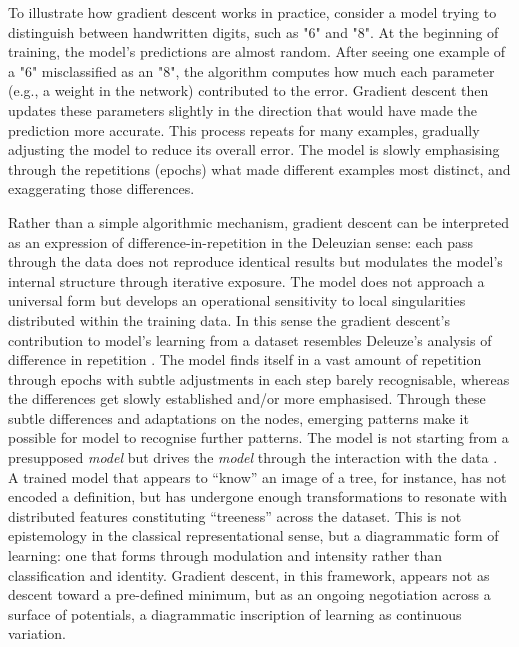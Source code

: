 To illustrate how gradient descent works in practice, consider a model trying to distinguish between handwritten digits, such as "6" and "8". At the beginning of training, the model's predictions are almost random. After seeing one example of a "6" misclassified as an "8", the algorithm computes how much each parameter (e.g., a weight in the network) contributed to the error. Gradient descent then updates these parameters slightly in the direction that would have made the prediction more accurate. This process repeats for many examples, gradually adjusting the model to reduce its overall error. The model is slowly emphasising through the repetitions (\glspl{epoch}) what made different examples most distinct, and exaggerating those differences.


Rather than a simple algorithmic mechanism, gradient descent can be interpreted as an expression of difference-in-repetition in the Deleuzian sense: each pass through the data does not reproduce identical results but modulates the model’s internal structure through iterative exposure. The model does not approach a universal form but develops an operational sensitivity to local singularities distributed within the training data. In this sense the gradient descent's contribution to model's learning from a
dataset resembles Deleuze's analysis of difference in repetition \parencite{deleuze1994}. The model finds itself in a vast amount of repetition through \glspl{epoch} with subtle adjustments in each step barely recognisable, whereas the differences get slowly established and/or more emphasised. Through these subtle differences and adaptations on the nodes, emerging patterns make it possible for model to recognise further patterns. The model is not starting from a presupposed \textit{model} but drives the \textit{model} through the interaction with the data
.
A trained model that appears to “know” an image of a tree, for instance, has not encoded a definition, but has undergone enough transformations to resonate with distributed features constituting “treeness” across the dataset. This is not epistemology in the classical representational sense, but a diagrammatic form of learning: one that forms through modulation and intensity rather than classification and identity. Gradient descent, in this framework, appears not as descent toward a pre-defined minimum, but as an ongoing negotiation across a surface of potentials, a diagrammatic inscription of learning as continuous variation.


